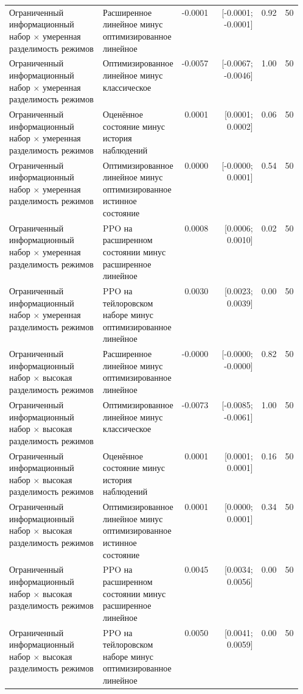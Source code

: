 \begin{tabular}{p{0.32\linewidth}p{0.24\linewidth}rrrr}
Ограниченный информационный набор × умеренная разделимость режимов & Расширенное линейное минус оптимизированное линейное & -0.0001 & [-0.0001; -0.0001] & 0.92 & 50 \\
Ограниченный информационный набор × умеренная разделимость режимов & Оптимизированное линейное минус классическое & -0.0057 & [-0.0067; -0.0046] & 1.00 & 50 \\
Ограниченный информационный набор × умеренная разделимость режимов & Оценённое состояние минус история наблюдений & 0.0001 & [0.0001; 0.0002] & 0.06 & 50 \\
Ограниченный информационный набор × умеренная разделимость режимов & Оптимизированное линейное минус оптимизированное истинное состояние & 0.0000 & [-0.0000; 0.0001] & 0.54 & 50 \\
Ограниченный информационный набор × умеренная разделимость режимов & PPO на расширенном состоянии минус расширенное линейное & 0.0008 & [0.0006; 0.0010] & 0.02 & 50 \\
Ограниченный информационный набор × умеренная разделимость режимов & PPO на тейлоровском наборе минус оптимизированное линейное & 0.0030 & [0.0023; 0.0039] & 0.00 & 50 \\
Ограниченный информационный набор × высокая разделимость режимов & Расширенное линейное минус оптимизированное линейное & -0.0000 & [-0.0000; -0.0000] & 0.82 & 50 \\
Ограниченный информационный набор × высокая разделимость режимов & Оптимизированное линейное минус классическое & -0.0073 & [-0.0085; -0.0061] & 1.00 & 50 \\
Ограниченный информационный набор × высокая разделимость режимов & Оценённое состояние минус история наблюдений & 0.0001 & [0.0001; 0.0001] & 0.16 & 50 \\
Ограниченный информационный набор × высокая разделимость режимов & Оптимизированное линейное минус оптимизированное истинное состояние & 0.0001 & [0.0000; 0.0001] & 0.34 & 50 \\
Ограниченный информационный набор × высокая разделимость режимов & PPO на расширенном состоянии минус расширенное линейное & 0.0045 & [0.0034; 0.0056] & 0.00 & 50 \\
Ограниченный информационный набор × высокая разделимость режимов & PPO на тейлоровском наборе минус оптимизированное линейное & 0.0050 & [0.0041; 0.0059] & 0.00 & 50 \\
\bottomrule
\end{tabular}